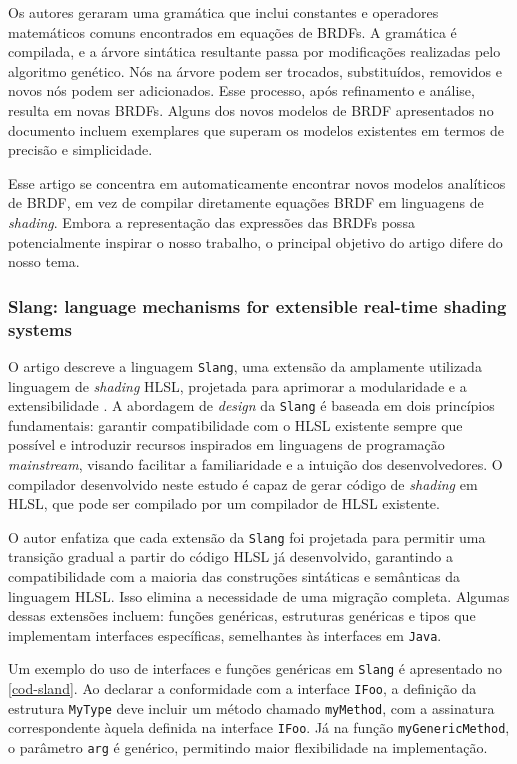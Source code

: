Os autores geraram uma gramática que inclui constantes e operadores matemáticos comuns encontrados em equações de BRDFs. A gramática é compilada, e a árvore sintática resultante passa por modificações realizadas pelo algoritmo genético. Nós na árvore podem ser trocados, substituídos, removidos e novos nós podem ser adicionados. Esse processo, após refinamento e análise, resulta em novas BRDFs. Alguns dos novos modelos de BRDF apresentados no documento incluem exemplares que superam os modelos existentes em termos de precisão e simplicidade.
 
Esse artigo se concentra em automaticamente encontrar novos modelos analíticos de BRDF, em vez de compilar diretamente equações BRDF em linguagens de \textit{shading}. Embora a representação das expressões das BRDFs possa potencialmente inspirar o nosso trabalho, o principal objetivo do artigo difere do nosso tema.


\subsubsection{Slang: language mechanisms for extensible real-time shading systems}


O artigo descreve a linguagem \texttt{Slang}, uma extensão da amplamente utilizada linguagem de \textit{shading} HLSL, projetada para aprimorar a modularidade e a extensibilidade \cite{slang}. A abordagem de \textit{design} da \texttt{Slang} é baseada em dois princípios fundamentais: garantir compatibilidade com o HLSL existente sempre que possível e introduzir recursos inspirados em linguagens de programação \textit{mainstream}, visando facilitar a familiaridade e a intuição dos desenvolvedores. O compilador desenvolvido neste estudo é capaz de gerar código de \textit{shading} em HLSL, que pode ser compilado por um compilador de HLSL existente.

O autor enfatiza que cada extensão da \texttt{Slang} foi projetada para permitir uma transição gradual a partir do código HLSL já desenvolvido, garantindo a compatibilidade com a maioria das construções sintáticas e semânticas da linguagem HLSL. Isso elimina a necessidade de uma migração completa. Algumas dessas extensões incluem: funções genéricas, estruturas genéricas e tipos que implementam interfaces específicas, semelhantes às interfaces em \texttt{Java}.

Um exemplo do uso de interfaces e funções genéricas em \texttt{Slang} é apresentado no \autoref{cod-sland}. Ao declarar a conformidade com a interface \texttt{IFoo}, a definição da estrutura \texttt{MyType} deve incluir um método chamado \texttt{myMethod}, com a assinatura correspondente àquela definida na interface \texttt{IFoo}. Já na função \texttt{myGenericMethod}, o parâmetro \texttt{arg} é genérico, permitindo maior flexibilidade na implementação.

